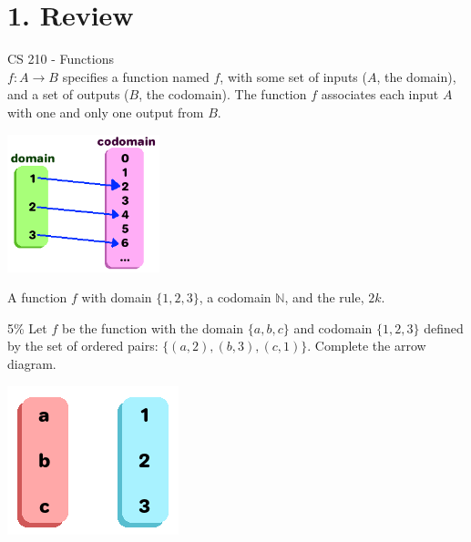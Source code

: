 \documentclass[a4paper,12pt]{book}
\title{}
\author{Rachel Morris}
\date{\today}
\begin{document}
    \toggletrue{answerkey}
    

    \section*{1. Review}

        \begin{intro}{CS 210 - Functions} ~\\
            $f : A \to B$ specifies a function named $f$,
            with some set of inputs ($A$, the domain), and a set of
            outputs ($B$, the codomain). The function $f$ associates
            each input $A$ with one and only one output from $B$.

            \begin{center}
                \includegraphics[height=4cm]{images/5-3-function.png}
            \end{center}
                
            A function $f$ with domain $\{1, 2, 3\}$,
            a codomain $\mathbb{N}$, and the rule, $2k$.
        \end{intro}

        \begin{question}{1}{5\%}
            Let $f$ be the function with the domain $\{a, b, c\}$ and codomain
            $\{1, 2, 3\}$ defined by the set of ordered pairs:
            $\{(a, 2), (b, 3), (c, 1)\}$. Complete the arrow diagram.

            \begin{center}
                \includegraphics{images/5-3-question-function.png}
            \end{center}
        \end{question}
\end{document}
